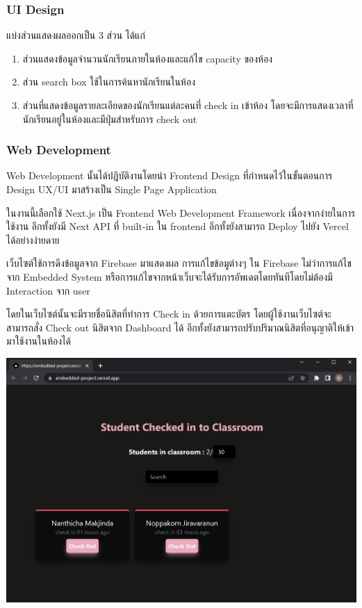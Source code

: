 \documentclass[fontsize=14pt]{extarticle}
\begin{document}
\subsubsection{UI Design}
แบ่งส่วนแสดงผลออกเป็น 3 ส่วน ได้แก่
\begin{enumerate}
    \item ส่วนแสดงข้อมูลจำนวนนักเรียนภายในห้องและแก้ไข capacity ของห้อง
    \item ส่วน search box ใช้ในการค้นหานักเรียนในห้อง
    \item ส่วนที่แสดงข้อมูลรายละเอียดของนักเรียนแต่ละคนที่ check in เข้าห้อง โดยจะมีการแสดงเวลาที่นักเรียนอยู่ในห้องและมีปุ่มสำหรับการ check out
\end{enumerate}
\subsubsection{Web Development}
\par Web Development นั้นได้ปฎิบัติงานโดยนำ Frontend Design ที่กำหนดไว้ในขั้นตอนการ
Design UX/UI มาสร้างเป็น Single Page Application
\par ในงานนี้เลือกใช้ Next.js เป็น Frontend Web Development Framework
เนื่องจากง่ายในการใช้งาน อีกทั้งยังมี Next API ที่ built-in ใน frontend
อีกทั้งยังสามารถ Deploy ไปยัง Vercel ได้อย่างง่ายดาย
\par เว็บไซต์ใช้การดึงข้อมูลจาก Firebase มาแสดงผล การแก้ไขข้อมูต่างๆ ใน Firebase
ไม่ว่าการแก้ไขจาก Embedded System หรือการแก้ไขจากหน้าเว็บจะได้รับการอัพเดตโดยทันทีโดยไม่ต้องมี
Interaction จาก user
\par โดยในเว็บไซต์นั้นจะมีรายชื่อนิสิตที่ทำการ Check in ด้วยการแตะบัตร
โดยผู้ใช้งานเว็บไซต์จะสามารถสั่ง Check out นิสิตจาก Dashboard ได้
อีกทั้งยังสามารถปรับปริมาณนิสิตที่อนุญาติให้เข้ามาใช้งานในห้องได้
\begin{center}
    \includegraphics[width=\textwidth]{Web.png}
\end{center}
\pagebreak
\end{document}
